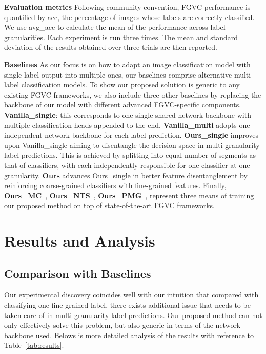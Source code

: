 \documentclass[final]{cvpr}
\newcommand{\keypoint}[1]{\vspace{0.05cm}\noindent\textbf{#1}\quad}
\begin{document}
\keypoint{Evaluation metrics} Following community convention, FGVC performance is quantified by acc, the percentage of images whose labels are correctly classified. We use avg\_acc to calculate the mean of the performance across label granularities. Each experiment is run three times. The mean and standard deviation of the results obtained over three trials are then reported.

\keypoint{Baselines} As our focus is on how to adapt an image classification model with single label output into multiple ones, our baselines comprise alternative multi-label classification models. To show our proposed solution is generic to any existing FGVC frameworks, we also include three other baselines by replacing the backbone of our model with different advanced FGVC-specific components. \textbf{Vanilla\_single}: this corresponds to one single shared network backbone with multiple classification heads appended to the end. \textbf{Vanilla\_multi} adopts one independent network backbone for each label prediction. \textbf{Ours\_single} improves upon Vanilla\_single aiming to disentangle the decision space in multi-granularity label predictions. This is achieved by splitting  into equal number of segments as that of classifiers, with each independently responsible for one classifier at one granularity. \textbf{Ours} advances Ours\_single in better feature disentanglement by reinforcing coarse-grained classifiers with fine-grained features. Finally, \textbf{Ours\_MC}~\cite{chang2020mc}, \textbf{Ours\_NTS}~\cite{yang2018learning}, \textbf{Ours\_PMG}~\cite{du2020fine}, represent three means of training our proposed method on top of state-of-the-art FGVC frameworks. 


\section{Results and Analysis}

\subsection{Comparison with Baselines}

Our experimental discovery coincides well with our intuition that compared with classifying one fine-grained label, there exists additional issue that needs to be taken care of in multi-granularity label predictions. Our proposed method can not only effectively solve this problem, but also generic in terms of the network backbone used. Belows is more detailed analysis of the results with reference to Table~\ref{tab:results}.
\end{document}

